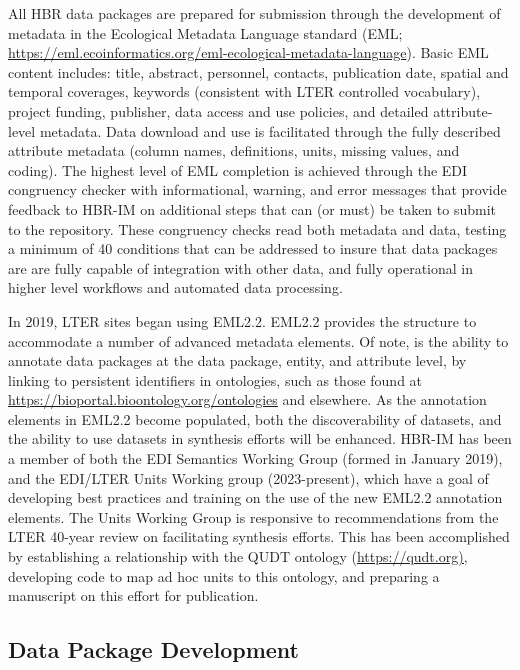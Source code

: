 \documentclass[
  letterpaper,
  DIV=11,
  numbers=noendperiod]{scrreprt}
\begin{document}
All HBR data packages are prepared for submission through the
development of metadata in the Ecological Metadata Language standard
(EML;
\url{https://eml.ecoinformatics.org/eml-ecological-metadata-language}).
Basic EML content includes: title, abstract, personnel, contacts,
publication date, spatial and temporal coverages, keywords (consistent
with LTER controlled vocabulary), project funding, publisher, data
access and use policies, and detailed attribute-level metadata. Data
download and use is facilitated through the fully described attribute
metadata (column names, definitions, units, missing values, and coding).
The highest level of EML completion is achieved through the EDI
congruency checker with informational, warning, and error messages that
provide feedback to HBR-IM on additional steps that can (or must) be
taken to submit to the repository. These congruency checks read both
metadata and data, testing a minimum of 40 conditions that can be
addressed to insure that data packages are are fully capable of
integration with other data, and fully operational in higher level
workflows and automated data processing.

In 2019, LTER sites began using EML2.2. EML2.2 provides the structure to
accommodate a number of advanced metadata elements. Of note, is the
ability to annotate data packages at the data package, entity, and
attribute level, by linking to persistent identifiers in ontologies,
such as those found at
\url{https://bioportal.bioontology.org/ontologies} and elsewhere. As the
annotation elements in EML2.2 become populated, both the discoverability
of datasets, and the ability to use datasets in synthesis efforts will
be enhanced. HBR-IM has been a member of both the EDI Semantics Working
Group (formed in January 2019), and the EDI/LTER Units Working group
(2023-present), which have a goal of developing best practices and
training on the use of the new EML2.2 annotation elements. The Units
Working Group is responsive to recommendations from the LTER 40-year
review on facilitating synthesis efforts. This has been accomplished by
establishing a relationship with the QUDT ontology
(\url{https://qudt.org),} developing code to map ad hoc units to this
ontology, and preparing a manuscript on this effort for publication.

\subsection{Data Package Development}\label{data-package-development}
\end{document}
